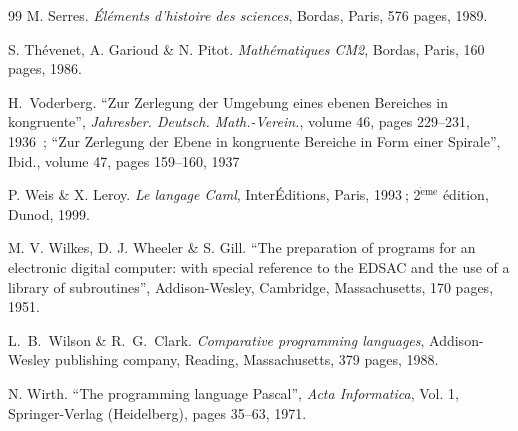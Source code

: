 \begin{thebibliography}{99}
 M. Serres.
{\em Éléments d'histoire des sciences},  Bordas, Paris, 576 pages, 1989.

 S. Thévenet, A. Garioud \& N. Pitot.
{\em Mathématiques CM2},  Bordas, Paris, 160 pages, 1986.

 H.~Voderberg.
``Zur Zerlegung der Umgebung eines ebenen Bereiches in kongruente'', 
{\em Jahresber. Deutsch. Math.-Verein.}, 
volume 46, pages 229--231, 1936~;
``Zur Zerlegung der Ebene in kongruente Bereiche in Form einer Spirale'', 
{Ibid.}, 
volume 47, pages 159--160, 1937


 P. Weis \& X. Leroy.
{\em Le langage Caml}, InterÉditions, Paris, 1993$\:$; 2$^{\mathrm{\grave{e}me}}$ édition, Dunod, 1999.

 M. V. Wilkes, D. J. Wheeler \& S. Gill. 
``The preparation of programs for an electronic digital computer: with special reference to 
the EDSAC and the use of a library of subroutines'', Addison-Wesley, Cambridge, 
Massachusetts, 170 pages, 1951.

 L.~B.~Wilson \& R.~G.~Clark.
{\em Comparative programming languages},  Addison-Wesley publishing company,
 Reading, Massachusetts, 379 pages, 1988.

 N. Wirth.
``The programming language Pascal'', {\em Acta Informatica}, Vol. 1, Springer-Verlag (Heidelberg), 
pages 35--63, 1971.

\end{thebibliography}

